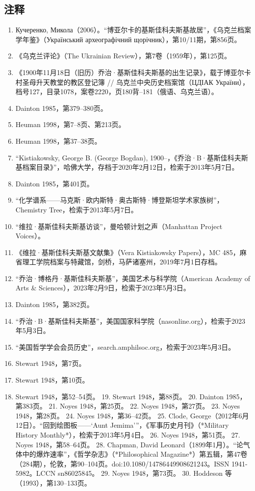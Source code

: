 \subsection{注释}
\begin{enumerate}
\item Кучеренко, Микола（2006）。“博亚尔卡的基斯佳科夫斯基故居”，《乌克兰档案学年鉴》（Український археографічний щорічник），第10/11期，第856页。
\item 《乌克兰评论》（The Ukrainian Review），第7卷（1959年），第125页。
\item 《1900年11月18日（旧历）乔治·基斯佳科夫斯基的出生记录》，载于博亚尔卡村圣母升天教堂的教区登记簿 // 乌克兰中央历史档案馆（ЦДІАК України），档号127，目录1078，案卷2220，页180背–181（俄语、乌克兰语）。
\item Dainton 1985，第379–380页。
\item Heuman 1998，第7–8页、第213页。
\item Heuman 1998，第37–38页。
\item “Kistiakowsky, George B. (George Bogdan), 1900–，《乔治·B·基斯佳科夫斯基档案目录》”，哈佛大学，存档于2020年2月12日，检索于2013年5月7日。
\item Dainton 1985，第401页。
\item “化学谱系——马克斯·欧内斯特·奥古斯特·博登斯坦学术家族树”，Chemistry Tree，检索于2013年5月7日。
\item “维拉·基斯佳科夫斯基访谈”，曼哈顿计划之声（Manhattan Project Voices）。
\item 《维拉·基斯佳科夫斯基文献集》（Vera Kistiakowsky Papers），MC 485，麻省理工学院档案与特藏馆，剑桥，马萨诸塞州，2019年7月1日存档。
\item “乔治·博格丹·基斯佳科夫斯基”，美国艺术与科学院（American Academy of Arts & Sciences），2023年2月9日，检索于2023年5月3日。
\item Dainton 1985，第382页。
\item “乔治·B·基斯佳科夫斯基”，美国国家科学院（nasonline.org），检索于2023年5月3日。
\item “美国哲学学会会员历史”，search.amphilsoc.org，检索于2023年5月3日。
\item Stewart 1948，第7页。
\item Stewart 1948，第10页。
\item Stewart 1948，第52–54页。
19. Stewart 1948，第88页。
20. Dainton 1985，第383页。
21. Noyes 1948，第25页。
22. Noyes 1948，第27页。
23. Noyes 1948，第28页。
24. Noyes 1948，第36–42页。
25. Clode, George（2012年6月12日）。“回到绘图板——‘Aunt Jemima’”，《军事历史月刊》（*Military History Monthly*），检索于2013年5月4日。
26. Noyes 1948，第51页。
27. Noyes 1948，第58–64页。
28. Chapman, David Leonard（1899年1月）。“论气体中的爆炸速率”，《哲学杂志》（*Philosophical Magazine*）第五辑，第47卷（284期），伦敦，第90–104页。doi:10.1080/14786449908621243。ISSN 1941-5982。LCCN sn86025845。
29. Noyes 1948，第73页。
30. Hoddeson 等（1993），第130–133页。

\end{enumerate}